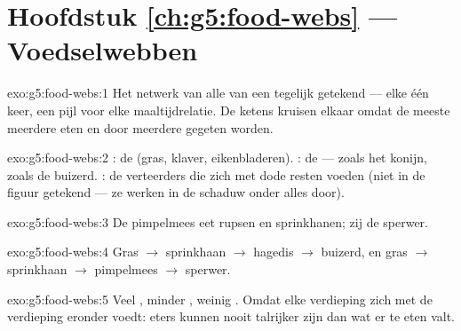 \section*{Hoofdstuk \ref{ch:g5:food-webs} --- Voedselwebben}

\begin{solution}{exo:g5:food-webs:1}
Het netwerk van alle  van een  tegelijk getekend
--- elke  één keer, een pijl voor elke maaltijdrelatie. De ketens
kruisen elkaar omdat de meeste  meerdere  eten en door
meerdere  gegeten worden.
\end{solution}

\begin{solution}{exo:g5:food-webs:2}
: de  (gras, klaver, eikenbladeren). : de
 ---  zoals het konijn,  zoals de buizerd.
: de verteerders die zich met dode resten voeden (niet in de
figuur getekend --- ze werken in de schaduw onder alles door).
\end{solution}

\begin{solution}{exo:g5:food-webs:3}
De pimpelmees eet rupsen en sprinkhanen; zij  de
sperwer.
\end{solution}

\begin{solution}{exo:g5:food-webs:4}
Gras $\rightarrow$ sprinkhaan $\rightarrow$ hagedis $\rightarrow$
buizerd, en gras $\rightarrow$ sprinkhaan $\rightarrow$ pimpelmees
$\rightarrow$ sperwer.
\end{solution}

\begin{solution}{exo:g5:food-webs:5}
Veel , minder , weinig . Omdat elke
verdieping zich met de verdieping eronder voedt: eters kunnen nooit
talrijker zijn dan wat er te eten valt.
\end{solution}

